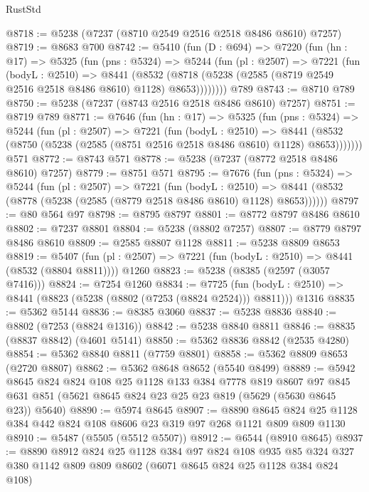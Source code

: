 \begin{lexlean}{RustStd}
\begin{coremodule}
@8718 := @5238 (@7237 (@8710 @2549 @2516 @2518 @8486 @8610) @7257)
@8719 := @8683 @700
@8742 := @5410
    (fun (D : @694) =>
    @7220
      (fun (hn : @17) =>
      @5325
        (fun (pns : @5324) =>
        @5244
          (fun (pl : @2507) =>
          @7221
            (fun (bodyL : @2510) =>
            @8441
              (@8532 (@8718 (@5238 (@2585 (@8719 @2549 @2516 @2518 @8486 @8610) @1128) @8653))))))))
    @789
@8743 := @8710 @789
@8750 := @5238 (@7237 (@8743 @2516 @2518 @8486 @8610) @7257)
@8751 := @8719 @789
@8771 := @7646
    (fun (hn : @17) =>
    @5325
      (fun (pns : @5324) =>
      @5244
        (fun (pl : @2507) =>
        @7221
          (fun (bodyL : @2510) =>
          @8441 (@8532 (@8750 (@5238 (@2585 (@8751 @2516 @2518 @8486 @8610) @1128) @8653)))))))
    @571
@8772 := @8743 @571
@8778 := @5238 (@7237 (@8772 @2518 @8486 @8610) @7257)
@8779 := @8751 @571
@8795 := @7676
    (fun (pns : @5324) =>
    @5244
      (fun (pl : @2507) =>
      @7221
        (fun (bodyL : @2510) =>
        @8441 (@8532 (@8778 (@5238 (@2585 (@8779 @2518 @8486 @8610) @1128) @8653))))))
@8797 := @80 @564 @97
@8798 := @8795 @8797
@8801 := @8772 @8797 @8486 @8610
@8802 := @7237 @8801
@8804 := @5238 (@8802 @7257)
@8807 := @8779 @8797 @8486 @8610
@8809 := @2585 @8807 @1128
@8811 := @5238 @8809 @8653
@8819 := @5407
    (fun (pl : @2507) => @7221 (fun (bodyL : @2510) => @8441 (@8532 (@8804 @8811))))
    @1260
@8823 := @5238 (@8385 (@2597 (@3057 @7416)))
@8824 := @7254 @1260
@8834 := @7725
    (fun (bodyL : @2510) => @8441 (@8823 (@5238 (@8802 (@7253 (@8824 @2524))) @8811)))
    @1316
@8835 := @5362 @5144
@8836 := @8385 @3060
@8837 := @5238 @8836
@8840 := @8802 (@7253 (@8824 @1316))
@8842 := @5238 @8840 @8811
@8846 := @8835 (@8837 @8842) (@4601 @5141)
@8850 := @5362 @8836 @8842 (@2535 @4280)
@8854 := @5362 @8840 @8811 (@7759 @8801)
@8858 := @5362 @8809 @8653 (@2720 @8807)
@8862 := @5362 @8648 @8652 (@5540 @8499)
@8889 := @5942
    @8645
    @824
    @824
    @108
    @25
    @1128
    @133
    @384
    @7778
    @819
    @8607
    @97
    @845
    @631
    @851
    (@5621 @8645 @824 @23 @25 @23 @819 (@5629 (@5630 @8645 @23)) @5640)
@8890 := @5974 @8645
@8907 := @8890
    @8645
    @824
    @25
    @1128
    @384
    @442
    @824
    @108
    @8606
    @23
    @319
    @97
    @268
    @1121
    @809
    @809
    @1130
@8910 := @5487 (@5505 (@5512 @5507))
@8912 := @6544 (@8910 @8645)
@8937 := @8890
    @8912
    @824
    @25
    @1128
    @384
    @97
    @824
    @108
    @935
    @85
    @324
    @327
    @380
    @1142
    @809
    @809
    @8602
    (@6071 @8645 @824 @25 @1128 @384 @824 @108)

\end{coremodule}
\end{lexlean}
